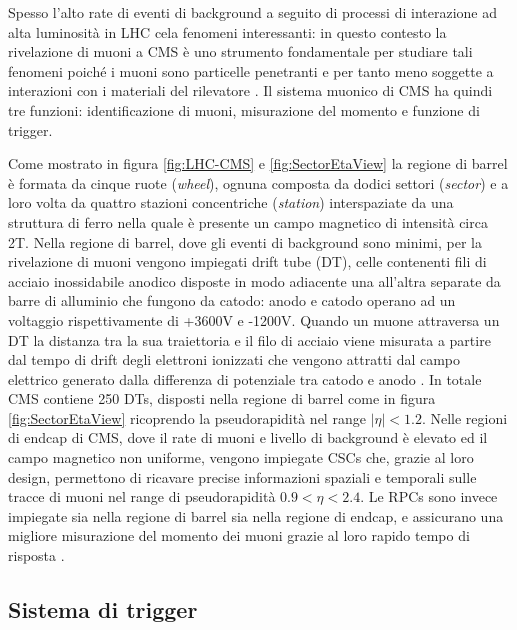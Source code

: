 Spesso l'alto rate di eventi di background a seguito di processi di interazione ad alta luminosità in LHC cela fenomeni interessanti: in questo contesto la rivelazione di muoni a CMS è uno strumento fondamentale per studiare tali fenomeni poiché i muoni sono particelle penetranti e per tanto meno soggette a interazioni con i materiali del rilevatore \cite{cms2008cms}. Il sistema muonico di CMS ha quindi tre funzioni: identificazione di muoni, misurazione del momento e funzione di trigger.


Come mostrato in figura \ref{fig:LHC-CMS} e \ref{fig:SectorEtaView} la regione di barrel è formata da cinque ruote (\textit{wheel}), ognuna composta da dodici settori (\textit{sector}) e a loro volta da quattro stazioni concentriche (\textit{station}) interspaziate da una struttura di ferro nella quale è presente un campo magnetico di intensità circa 2T. Nella regione di barrel, dove gli eventi di background sono minimi, per la rivelazione di muoni vengono impiegati drift tube (DT), celle contenenti fili di acciaio inossidabile anodico disposte in modo adiacente una all'altra separate da barre di alluminio che fungono da catodo: anodo e catodo operano ad un voltaggio rispettivamente di +3600V e -1200V. Quando un muone attraversa un DT la distanza tra la sua traiettoria e il filo di acciaio viene misurata a partire dal tempo di drift degli elettroni ionizzati che vengono attratti dal campo elettrico generato dalla differenza di potenziale tra catodo e anodo \cite{MasterThesisNicLai}. \newline
In totale CMS contiene 250 DTs, disposti nella regione di barrel come in figura \ref{fig:SectorEtaView} ricoprendo la pseudorapidità nel range $|\eta| < 1.2$. \newline
Nelle regioni di endcap di CMS, dove il rate di muoni e livello di background è elevato ed il campo magnetico non uniforme, vengono impiegate CSCs che, grazie al loro design, permettono di ricavare precise informazioni spaziali e temporali sulle tracce di muoni nel range di pseudorapidità $0.9 < \eta < 2.4$. Le RPCs sono invece impiegate sia nella regione di barrel sia nella regione di endcap, e assicurano una migliore misurazione del momento dei muoni grazie al loro rapido tempo di risposta \cite{MasterThesisNicLai, cms2008cms}.


\subsection{Sistema di trigger}
\label{sec:SistemaDiTrigger}

